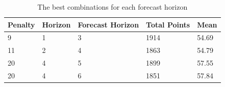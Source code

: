 \begin{table}[H]
\centering
\begin{tabular}{|l|l|l|l|l|}
\hline
Penalty & Horizon & Forecast Horizon & Total Points & Mean  \\
\hline
9       & 1       & 3                & 1914         & 54.69 \\
11      & 2       & 4                & 1863         & 54.79 \\
20      & 4       & 5                & 1899         & 57.55 \\
20      & 4       & 6                & 1851         & 57.84 \\
\hline
\end{tabular}
\caption{The best combinations for each forecast horizon}
\label{tab:top_5}
\end{table}

